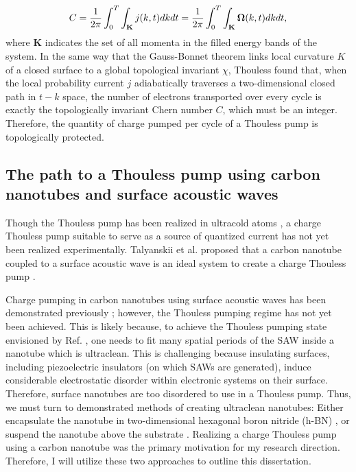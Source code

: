 \documentclass[double,12pt,1in]{beavtex}
\begin{document}
\begin{equation}
    C = \frac{1}{2\pi} \int_{0}^{T} \int_{\mathbf{K}} j(k,t) dkdt = \frac{1}{2\pi} \int_{0}^{T} \int_{\mathbf{K}} \vectorbold{\Omega}(k,t)dkdt, \label{Thouless Chern equation}
\end{equation}
where $\mathbf{K}$ indicates the set of all momenta in the filled energy bands of the system. In the same way that the Gauss-Bonnet theorem links local curvature $K$ of a closed surface to a global topological invariant $\chi$, Thouless found that, when the local probability current $j$ adiabatically traverses a two-dimensional closed path in $t-k$ space, the number of electrons transported over every cycle is exactly the topologically invariant Chern number $C$, which must be an integer. Therefore, the quantity of charge pumped per cycle of a Thouless pump is topologically protected.


\subsection{The path to a Thouless pump using carbon nanotubes and surface acoustic waves}

Though the Thouless pump has been realized in ultracold atoms \cite{citro_thouless_2023}, a charge Thouless pump suitable to serve as a source of quantized current has not yet been realized experimentally. Talyanskii et al. proposed that a carbon nanotube coupled to a surface acoustic wave is an ideal system to create a charge Thouless pump \cite{talyanskii_quantized_2001}. 

Charge pumping in carbon nanotubes using surface acoustic waves has been demonstrated previously \cite{buitelaar_adiabatic_2008}; however, the Thouless pumping regime has not yet been achieved. This is likely because, to achieve the Thouless pumping state envisioned by Ref. \cite{talyanskii_quantized_2001}, one needs to fit many spatial periods of the SAW inside a nanotube which is ultraclean. This is challenging because insulating surfaces, including piezoelectric insulators (on which SAWs are generated), induce considerable electrostatic disorder within electronic systems on their surface. Therefore, surface nanotubes are too disordered to use in a Thouless pump. Thus, we must turn to demonstrated methods of creating ultraclean nanotubes: Either encapsulate the nanotube in two-dimensional hexagonal boron nitride (h-BN) \cite{huang_superior_2015}, or suspend the nanotube above the substrate \cite{senger_universal_2018}. Realizing a charge Thouless pump using a carbon nanotube was the primary motivation for my research direction. Therefore, I will utilize these two approaches to outline this dissertation.
\end{document}
